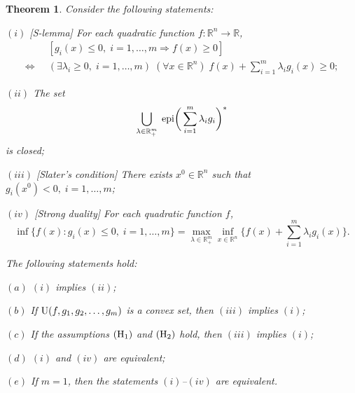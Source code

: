 \documentclass[]{interact}
\theoremstyle{plain}%
\newtheorem{theorem}{Theorem}[section]
\theoremstyle{definition}
\theoremstyle{remark}
\begin{document}
	\begin{theorem}\label{Theo7} 
		Consider the following statements:
		\begin{description}
			\item{$(i)$} {\rm [S-lemma]} For each quadratic function $f:\mathbb{R}^n\to \mathbb{R}$,
			\begin{align*}
				&[g_i(x)\leq 0,\; i=1, \ldots, m \Rightarrow f(x)\geq 0] \\[0.3em]
				\Leftrightarrow \; \; &(\exists \lambda_i\geq0,\; i=1, \ldots, m)\; (\forall x\in \mathbb{R}^n)\;  
				f(x)+\sum_{i=1}^{m}\lambda_ig_i(x)\geq 0;
			\end{align*}
			
			\item{$(ii)$} The set
			$$\bigcup_{\lambda\in  \mathbb{R}^m_+} \; {\rm epi}\bigg(\sum_{i=1}^{m}\lambda_ig_i\bigg)^*$$
			is closed;
			
			\item{$(iii)$} {\rm [Slater's condition]} There exists $x^0\in \mathbb{R}^n$ such that
			$g_i(x^0)< 0,\; i=1, \ldots, m$;
			
			\item{$(iv)$} {\rm [Strong duality]} For each quadratic function $f$,
			\begin{equation}\label{e11} 
				\inf \{f(x): g_i(x)\leq 0,\; i=1,\ldots,m\}
				=\max_{\lambda\in \mathbb{R}^m_+}\inf_{x\in \mathbb{R}^n}
				\bigg\{f(x)+\sum_{i=1}^{m}\lambda_ig_i(x)\bigg\}.
			\end{equation}
		\end{description}
		The following statements hold:
		\begin{description}
			\item{$(a)$} $(i)$ implies $(ii)$;
			
			\item{$(b)$} If ${\rm U}(f, g_1, g_2,\ldots,g_m)$ is a convex set, then $(iii)$ implies $(i)$; 
			
			\item{$(c)$} If the assumptions $({\rm H_1})$ and $({\rm H_2})$ hold, then $(iii)$ implies $(i)$;
			
			\item{$(d)$} $(i)$ and $(iv)$ are equivalent;
			
			\item{$(e)$} If $m=1$, then the statements $(i)$--$(iv)$ are equivalent.
		\end{description}
	\end{theorem}
	
\end{document}

